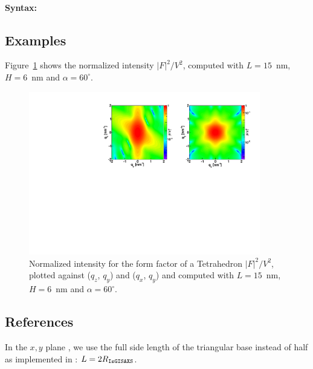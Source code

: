 \paragraph{Syntax:} 

\subsection{Examples}
Figure~\ref{figFFtetrahEx} shows the normalized intensity
$|F|^2/V^2$, computed with $L=15$~nm, $H=6$~nm and $\alpha =60 ^{\circ}$.
\begin{figure}[h]
\begin{center}
\includegraphics[width=0.9\textwidth]{Figures/figfftetrahedron}
\end{center}
\caption{Normalized intensity for the form factor of a Tetrahedron
  $|F|^2/V^2$, plotted against ($q_z$, $q_y$) and  ($q_x$, $q_y$) and
  computed with $L=15$~nm, $H=6$~nm and $\alpha=60^{\circ}$.}
\label{figFFtetrahEx}
\end{figure}

\FloatBarrier

\subsection{References}
In the $x,y$ plane , we use the full side length of the triangular
base instead of  half as implemented in : $L= 2
R_{\rm{\texttt{IsGISAXS}}}$.

